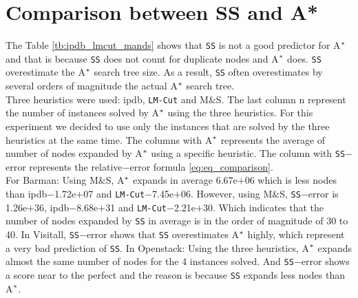 \section{Comparison between SS and A*}
\noindent
The Table \ref{tb:ipdb_lmcut_mands} shows that \texttt{SS} is not a good predictor for A$\sp{*}$ and that is because \texttt{SS} does not count for duplicate nodes and A$\sp{*}$ does. \texttt{SS} overestimate the A$\sp{*}$ search tree size. As a result, \texttt{SS} often overestimates by several orders of magnitude the actual A$\sp{*}$ search tree.\\

Three heuristics were used: ipdb, \texttt{LM-Cut} and M$\&$S.  The last column \textsf{n} represent the number of instances solved by A$\sp{*}$ using the three heuristics. For this experiment we decided to use only the instances that are solved by the three heuristics at the same time. The columns with A$\sp{*}$ represents the average of number of nodes expanded by A$\sp{*}$ using a specific heuristic. The column with \texttt{SS}$-$error represents the relative$-$error formula \ref{eq:eq_comparison}.\\

For Barman: Using M$\&$S, A$\sp{*}$ expands in average 6.67e$+$06 which is less nodes than ipdb$-$1.72e$+$07 and \texttt{LM-Cut}$-$7.45e$+$06. However, using M$\&$S, \texttt{SS}$-$error is 1.26e$+$36, ipdb$-$8.68e$+$31 and \texttt{LM-Cut}$-$2.21e$+$30. Which indicates that the number of nodes expanded by \texttt{SS} in average is in the order of magnitude of 30 to 40. In Visitall, \texttt{SS}$-$error shows that \texttt{SS} overestimates A$\sp{*}$ highly, which represent a very bad prediction of \texttt{SS}. In Openstack: Using the three heuristics, A$\sp{*}$ expands almost the same number of nodes for the 4 instances solved. And \texttt{SS}$-$error shows a score near to the perfect and the reason is because \texttt{SS} expands less nodes than A$\sp{*}$. 



